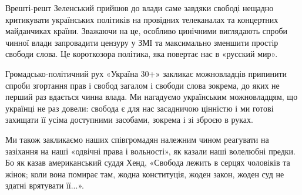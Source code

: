 Врешті-решт Зеленський прийшов до влади саме завдяки свободі нещадно
критикувати українських політиків на провідних телеканалах та концертних
майданчиках країни. Зважаючи на це, особливо цинічними виглядають спроби чинної
влади запровадити цензуру у ЗМІ та максимально зменшити простір свободи слова.
Це короткозора політика, яка повертає нас в «русский мир». 

Громадсько-політичний рух «Україна 30+» закликає можновладців припинити спроби
згортання прав і свобод загалом і свободи слова зокрема, до яких не перший раз
вдається чинна влада. Ми нагадуємо українським можновладцям, що українці не раз
довели: свобода є для нас засадничою цінністю і ми готові захищати її усіма
доступними засобами, зокрема і зі зброєю в руках.

Ми також закликаємо наших співгромадян належним чином реагувати на зазіхання на
наші «одвічні права і вольності», як казали наші волелюбні предки. Бо як казав
американський суддя Хенд, «Свобода лежить в серцях чоловіків та жінок; коли
вона помирає там, жодна конституція, жоден закон, жоден суд не здатні врятувати
її...».
